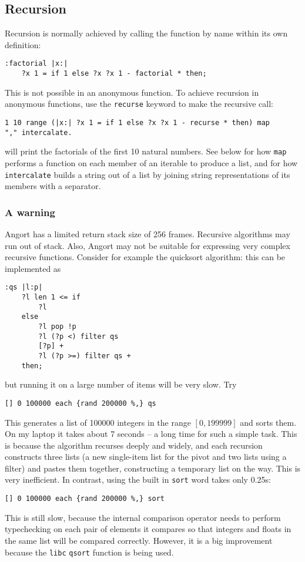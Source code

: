 \subsection{Recursion}
Recursion is normally achieved by calling the function by name within
its own definition:
\begin{lstlisting}
:factorial |x:|
    ?x 1 = if 1 else ?x ?x 1 - factorial * then;
\end{lstlisting}
This is not possible in an anonymous function. To achieve recursion
in anonymous functions, use the
\texttt{recurse} keyword to make the recursive call:
\begin{lstlisting}
1 10 range (|x:| ?x 1 = if 1 else ?x ?x 1 - recurse * then) map
"," intercalate.
\end{lstlisting}
will print the factorials of the first 10 natural numbers. See below
for how \texttt{map} performs a function on each member of an iterable
to produce a list, and for how \texttt{intercalate} builds a string
out of a list by joining string representations of its members with
a separator.
\subsubsection{A warning}
Angort has a limited return stack size of 256 frames. Recursive algorithms
may run out of stack. Also, Angort may not be suitable for expressing
very complex recursive functions. Consider for example the quicksort algorithm:
this can be implemented as
\begin{lstlisting}
:qs |l:p| 
    ?l len 1 <= if 
        ?l 
    else 
        ?l pop !p 
        ?l (?p <) filter qs 
        [?p] + 
        ?l (?p >=) filter qs + 
    then;
\end{lstlisting}
but running it on a large number of items will be very slow. Try
\begin{lstlisting}
[] 0 100000 each {rand 200000 %,} qs
\end{lstlisting}
This generates a list of 100000 integers in the range $[0,199999]$ and
sorts them. On my laptop it takes about 7 seconds -- a long time for
such a simple task.
This is because the algorithm recurses deeply and widely,
and each recursion constructs 
three lists (a new single-item list for the pivot and two lists
using a filter) and pastes them together, constructing a temporary 
list on the way. This is very inefficient.
In contrast, using the built in \texttt{sort} word takes only 0.25s:
\begin{lstlisting}
[] 0 100000 each {rand 200000 %,} sort
\end{lstlisting}
This is still slow, because the internal comparison operator
needs to perform typechecking on each pair of elements it compares
so that integers and floats in the same list will be compared
correctly. However, it is a big improvement because the \texttt{libc} 
\texttt{qsort} function is being used.


